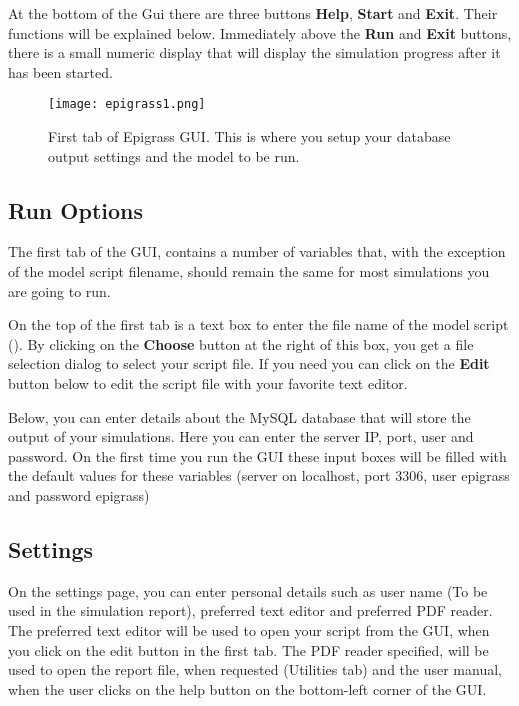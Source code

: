 \documentclass[a4paper,10pt]{manual}
\begin{document}
At the bottom of the Gui there are three buttons \textbf{Help}, \textbf{Start} and \textbf{Exit}. Their functions will be explained below. Immediately above the \textbf{Run} and \textbf{Exit} buttons, there is a small numeric display that will display the simulation progress after it has been started.
\begin{figure}[htbp]
\centering

\texttt{[image: epigrass1.png]}
\caption{First tab of Epigrass GUI. This is where you setup your database output settings and the model to be run.}\end{figure}


\subsection{Run Options}

The first tab of the GUI, contains a number of variables that, with the exception of the model script filename, should remain the same for most simulations you are going to run.

On the top of the first tab is a text box to enter the file name of the model script (). By clicking on the \textbf{Choose} button at the right of this box, you get a file selection dialog to select your script file. If you need you can click on the \textbf{Edit} button below to edit the script file with your favorite text editor.

Below, you can enter details about the MySQL database that will store the output of your simulations. Here you can enter the server IP, port, user and password. On the first time you run the GUI these input boxes will be filled with the default values for these variables (server on localhost, port 3306, user epigrass and password epigrass)


\subsection{Settings}

On the settings page, you can enter personal details such as user name (To be used in the simulation report), preferred text editor and preferred PDF reader. The preferred text editor will be used to open your script from the GUI, when you click on the edit button in the first tab. The PDF reader specified, will be used to open the report file, when requested (Utilities tab) and the user manual, when the user clicks on the help button on the bottom-left corner of the GUI.
\end{document}
